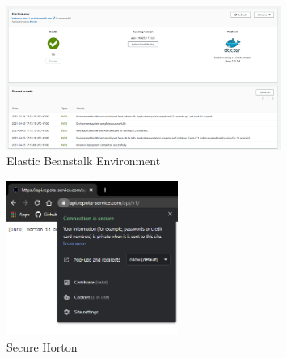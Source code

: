 \begin{figure}[H]
    \caption{Elastic Beanstalk Environment}
    \label{image:elasticHorton}
    \centering
    \includegraphics[width=0.8\textwidth]{images/aws/elastic_horton.png}
\end{figure}

\begin{figure}[H]
    \caption{Secure Horton}
    \label{image:secureHorton}
    \centering
    \includegraphics[width=0.5\textwidth]{images/aws/secure_horton.png}
\end{figure}

